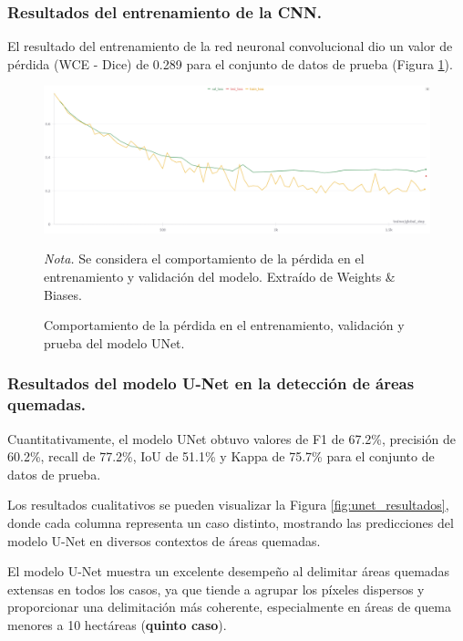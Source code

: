 \subsubsection{Resultados del entrenamiento de la CNN.}
El resultado del entrenamiento de la red neuronal convolucional dio un valor de pérdida (WCE - Dice) de 0.289 para el
conjunto de datos de prueba (Figura \ref{fig:entrenamiento}).
\begin{figure}[H]
    \centering
    \caption{Comportamiento de la pérdida en el entrenamiento, validación y prueba del modelo UNet.}
    \label{fig:entrenamiento}
    \includegraphics[width=1\textwidth]{img/7_resultados/cnn_loss.png}
    \begin{flushleft}
        \textit{Nota.} Se considera el comportamiento de la pérdida en el entrenamiento y validación del modelo. Extraído de Weights \& Biases.        
        \vspace{-\baselineskip}
    \end{flushleft}
\end{figure}

\subsubsection{Resultados del modelo U-Net en la detección de áreas quemadas.}

Cuantitativamente, el modelo UNet obtuvo valores de F1 de 67.2\%, precisión de 60.2\%, 
recall de 77.2\%, IoU de 51.1\% y Kappa de 75.7\% para el conjunto de datos de prueba.

Los resultados cualitativos se pueden visualizar la Figura \ref{fig:unet_resultados}, donde cada columna representa un caso distinto, mostrando las 
predicciones del modelo U-Net en diversos contextos de áreas quemadas.

El modelo U-Net muestra un excelente desempeño al delimitar áreas quemadas extensas en todos los casos, ya que tiende a agrupar 
los píxeles dispersos y proporcionar una delimitación más coherente, especialmente en áreas de quema menores a 10 hectáreas (\textbf{quinto caso}).

